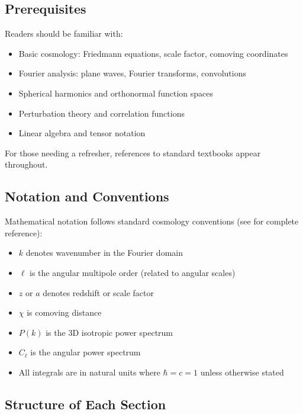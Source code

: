 \subsection{Prerequisites}\label{subsec:intro_prereq}

Readers should be familiar with:

\begin{itemize}
    \item Basic cosmology: Friedmann equations, scale factor, comoving coordinates
    \item Fourier analysis: plane waves, Fourier transforms, convolutions
    \item Spherical harmonics and orthonormal function spaces
    \item Perturbation theory and correlation functions
    \item Linear algebra and tensor notation
\end{itemize}

For those needing a refresher, references to standard textbooks appear throughout.

\subsection{Notation and Conventions}\label{subsec:intro_notation}

Mathematical notation follows standard cosmology conventions (see  for complete reference):

\begin{itemize}
    \item $k$ denotes wavenumber in the Fourier domain
    \item $\ell$ is the angular multipole order (related to angular scales)
    \item $z$ or $a$ denotes redshift or scale factor
    \item $\chi$ is comoving distance
    \item $P(k)$ is the 3D isotropic power spectrum
    \item $C_\ell$ is the angular power spectrum
    \item All integrals are in natural units where $\hbar = c = 1$ unless otherwise stated
\end{itemize}

\subsection{Structure of Each Section}\label{subsec:intro_structure}

